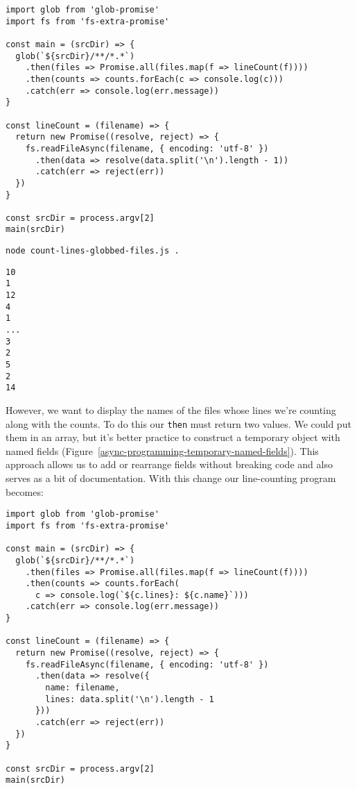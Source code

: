 \documentclass[krantzl]{krantz}
\newcommand{\figref}[1]{Figure~\ref{#1}}
\begin{document}
\begin{lstlisting}[frame=tblr]
import glob from 'glob-promise'
import fs from 'fs-extra-promise'

const main = (srcDir) => {
  glob(`${srcDir}/**/*.*`)
    .then(files => Promise.all(files.map(f => lineCount(f))))
    .then(counts => counts.forEach(c => console.log(c)))
    .catch(err => console.log(err.message))
}

const lineCount = (filename) => {
  return new Promise((resolve, reject) => {
    fs.readFileAsync(filename, { encoding: 'utf-8' })
      .then(data => resolve(data.split('\n').length - 1))
      .catch(err => reject(err))
  })
}

const srcDir = process.argv[2]
main(srcDir)
\end{lstlisting}



\begin{lstlisting}[frame=shadowbox]
node count-lines-globbed-files.js .
\end{lstlisting}



\begin{lstlisting}[frame=tblr,backgroundcolor=\color{black!5}]
10
1
12
4
1
...
3
2
5
2
14
\end{lstlisting}



However,
we want to display the names of the files whose lines we’re counting along with the counts.
To do this our \texttt{then} must return two values.
We could put them in an array,
but it’s better practice to construct a temporary object with named fields
(\figref{async-programming-temporary-named-fields}).
This approach allows us to add or rearrange fields without breaking code
and also serves as a bit of documentation.
With this change
our line-counting program becomes:


\begin{lstlisting}[frame=tblr]
import glob from 'glob-promise'
import fs from 'fs-extra-promise'

const main = (srcDir) => {
  glob(`${srcDir}/**/*.*`)
    .then(files => Promise.all(files.map(f => lineCount(f))))
    .then(counts => counts.forEach(
      c => console.log(`${c.lines}: ${c.name}`)))
    .catch(err => console.log(err.message))
}

const lineCount = (filename) => {
  return new Promise((resolve, reject) => {
    fs.readFileAsync(filename, { encoding: 'utf-8' })
      .then(data => resolve({
        name: filename,
        lines: data.split('\n').length - 1
      }))
      .catch(err => reject(err))
  })
}

const srcDir = process.argv[2]
main(srcDir)
\end{lstlisting}
\end{document}
